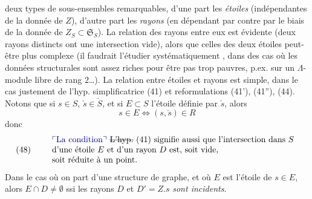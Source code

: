 \documentclass[11pt,a4paper]{article}
\begin{document}
deux types de sous-ensembles remarquables, d'une part les \emph{étoiles} (indépendantes de la donnée de $Z$), d'autre part les \emph{rayons} (en dépendant par contre par le biais de la donnée de $Z_S \subset \mathfrak{S}_S$). La relation  des rayons entre eux est évidente (deux rayons distincts ont une intersection vide), alors que celles des deux étoiles peut-être plus complexe (il faudrait l'étudier systématiquement , dans des cas où les données structurales sont assez riches pour être pas \struck{\ill{}} trop pauvres, p.ex. sur un $\Lambda$-module libre de rang $2$…). La relation entre étoiles et rayons est simple, dans le cas justement de l'hyp. simplificatrice (41) et reformulations (41'), (41''), (44).
   Notons  que si $s \in S$, $\check{s} \in \check{S}$, et si $E \subset S$ l'étoile définie par $\check{s}$, alors
\[
s \in E \iff (s, \check{s}) \in R
\]
donc 
\[
(48) \qquad
\begin{array}{l}
\text{\add{La condition}} \ \text{\struck{L'hyp.}} \ (41) \text{ signifie aussi que l'intersection dans $S$} \\
\text{d'une étoile $E$ et d'un rayon $D$ est, soit vide,} \\
\text{soit réduite à un point.}
\end{array}
\]
Dans le cas où on part d'une structure de graphe, et où $E$ est l'étoile de $s \in E$, alors $E \cap D \neq \emptyset$ ssi les rayons $D$ et \struck{\ill{}} $D' = Z.s$ \emph{sont incidents}.
\end{document}
